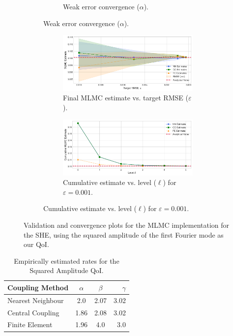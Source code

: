 \begin{figure}[htbp]
\begin{subfigure}{\textwidth}
\begin{subfigure}[b]{0.48\textwidth}
            \caption{Weak error convergence ($\alpha$).}
            \label{fig:mean_decay}
        \end{subfigure}
    \end{subfigure}
    \vspace{1cm}
    \begin{subfigure}{\textwidth}
        \centering
        \begin{subfigure}[b]{\textwidth}
            \centering
            \includegraphics[width=0.7\linewidth]{graphics/she_sq_amp_conv.png}
            \caption{Final MLMC estimate vs. target RMSE ($\varepsilon$).}
            \label{fig:conv_vs_eps}
        \end{subfigure}
        \vspace{0.5cm}
        \begin{subfigure}[b]{\textwidth}
            \centering
            \includegraphics[width=0.7\linewidth]{graphics/she_sq_amp_cumconv.png}
            \caption{Cumulative estimate vs. level ($\ell$) for $\varepsilon=0.001$.}
            \label{fig:cumulative_conv}
        \end{subfigure}
    \end{subfigure}
    \caption{Validation and convergence plots for the MLMC implementation for the SHE, using the squared 
    amplitude of the first Fourier mode as our QoI.}
    \label{fig:she_validation_combined}
\end{figure}

\begin{table}[htbp]
    \centering
    \begin{tabular}{|l|c|c|r|}
        \hline
        \textbf{Coupling Method} & \textbf{$\alpha$} & \textbf{$\beta$} & \textbf{$\gamma$} \\
        \hline
        Nearest Neighbour & 2.0 & 2.07 & 3.02\\
        Central Coupling & 1.86 & 2.08 & 3.02 \\
        Finite Element & 1.96 & 4.0 & 3.0 \\
        \hline
    \end{tabular}
    \caption{Empirically estimated rates for the Squared Amplitude QoI.}
    \label{tab:she_decay_rates}
\end{table}


